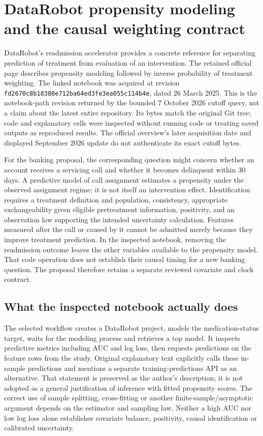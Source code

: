 \section{DataRobot propensity modeling and the causal weighting contract}
\label{sec:exec25-datarobot-reuse}
DataRobot's readmission accelerator provides a concrete reference for separating
prediction of treatment from evaluation of an intervention. The retained
official page describes propensity modeling followed by inverse probability
of treatment weighting. The linked notebook was acquired at revision
\texttt{fd2670c8b18380e712ba}\allowbreak\texttt{64ed3fe3ea055c114b4e},
dated 26 March 2025. This is the notebook-path revision returned by the bounded
7 October 2026 cutoff query, not a claim about the latest entire repository.
Its bytes match the original Git tree; code and explanatory cells were
inspected without running code or treating saved outputs as reproduced results.
The official overview's later acquisition date and displayed September 2026
update do not authenticate its exact cutoff bytes.\citep{exec13_ch_datarobot,exec25_datarobot_notebook}

For the banking proposal, the corresponding question might concern whether
an account receives a servicing call and whether it becomes delinquent within
30 days. A predictive model of call assignment estimates a propensity under
the observed assignment regime; it is not itself an intervention effect.
Identification requires a treatment definition and population, consistency,
appropriate exchangeability given eligible pretreatment information, positivity,
and an observation law supporting the intended uncertainty calculation.
Features measured after the call or caused by it cannot be admitted merely
because they improve treatment prediction. In the inspected notebook, removing
the readmission outcome leaves the other variables available to the propensity
model. That code operation does not establish their causal timing for a new
banking question. The proposal therefore retains a separate reviewed covariate
and clock contract.\citep{exec25_datarobot_notebook,exec25_datarobot_choice}

\subsection{What the inspected notebook actually does}
The selected workflow creates a DataRobot project, models the medication-status
target, waits for the modeling process and retrieves a top model. It inspects
predictive metrics including AUC and log loss, then requests predictions on the
feature rows from the study. Original explanatory text explicitly calls these
in-sample predictions and mentions a separate training-predictions API as an
alternative. That statement is preserved as the author's description; it is
not adopted as a general justification of inference with fitted propensity
scores. The correct use of sample splitting, cross-fitting or another
finite-sample/asymptotic argument depends on the estimator and sampling law.
Neither a high AUC nor low log loss alone establishes covariate balance,
positivity, causal identification or calibrated uncertainty.\citep{exec25_datarobot_notebook,exec25_datarobot_choice}

